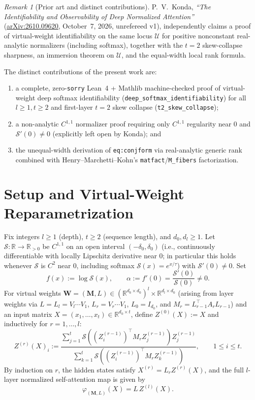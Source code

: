 \documentclass[11pt]{article}
\theoremstyle{plain}
\theoremstyle{definition}
\theoremstyle{remark}
\newtheorem{remark}{Remark}
\newcommand{\R}{\mathbb{R}}
\newcommand{\calS}{\mathcal{S}}
\newcommand{\calU}{\mathcal{U}}
\newcommand{\bfW}{\mathbf{W}}
\newcommand{\bfM}{\mathbf{M}}
\begin{document}
\begin{remark}[Prior art and distinct contributions]
P.\ V.\ Konda, \emph{``The Identifiability and Observability of Deep Normalized Attention''} (\href{https://arxiv.org/abs/2610.09620}{arXiv:2610.09620}, October~7, 2026, unrefereed v1), independently claims a proof of virtual-weight identifiability on the same locus $\calU$ for positive nonconstant real-analytic normalizers (including softmax), together with the $t = 2$ skew-collapse sharpness, an immersion theorem on $\calU$, and the equal-width local rank formula.

The distinct contributions of the present work are:
\begin{enumerate}[label=(\roman*),leftmargin=2.2em,itemsep=1pt]
    \item a complete, zero-\texttt{sorry} Lean~4 + Mathlib machine-checked proof of virtual-weight deep softmax identifiability (\texttt{deep\_softmax\_identifiability}) for all $l \ge 1, t \ge 2$ and first-layer $t = 2$ skew collapse (\texttt{t2\_skew\_collapse});
    \item a non-analytic $C^{1,1}$ normalizer proof requiring only $C^{1,1}$ regularity near $0$ and $\calS'(0) \neq 0$ (explicitly left open by Konda); and
    \item the unequal-width derivation of \texttt{eq:conjform} via real-analytic generic rank combined with Henry--Marchetti--Kohn's \texttt{matfact}/\texttt{M\_fibers} factorization.
\end{enumerate}
\end{remark}

\section{Setup and Virtual-Weight Reparametrization}

Fix integers $l \ge 1$ (depth), $t \ge 2$ (sequence length), and $d_0, d_l \ge 1$. Let $\calS : \R \to \R_{>0}$ be $C^{1,1}$ on an open interval $(-\delta_0, \delta_0)$ (i.e., continuously differentiable with locally Lipschitz derivative near $0$; in particular this holds whenever $\calS$ is $C^2$ near $0$, including softmax $\calS(x) = e^{x/\tau}$) with $\calS'(0) \neq 0$. Set
\[
f(x) := \log \calS(x), \qquad \alpha := f'(0) = \frac{\calS'(0)}{\calS(0)} \neq 0.
\]
For virtual weights $\bfW = (\bfM, L) \in (\R^{d_0 \times d_0})^l \times \R^{d_l \times d_0}$ (arising from layer weights via $L = L_l = V_l \cdots V_1$, $L_r = V_r \cdots V_1$, $L_0 = I_{d_0}$, and $M_r = L_{r-1}^\top A_r L_{r-1}$) and an input matrix $X = (x_1, \dots, x_t) \in \R^{d_0 \times t}$, define $Z^{(0)}(X) := X$ and inductively for $r = 1, \dots, l$:
\[
Z^{(r)}(X)_i :=
\frac{\sum_{j=1}^t \calS\!\left((Z^{(r-1)}_i)^\top M_r Z^{(r-1)}_j\right) Z^{(r-1)}_j}
{\sum_{k=1}^t \calS\!\left((Z^{(r-1)}_i)^\top M_r Z^{(r-1)}_k\right)},
\qquad 1 \le i \le t.
\]
By induction on $r$, the hidden states satisfy $X^{(r)} = L_r Z^{(r)}(X)$, and the full $l$-layer normalized self-attention map is given by
\[
\varphi_{(\bfM, L)}(X) = L\, Z^{(l)}(X).
\]
\end{document}
